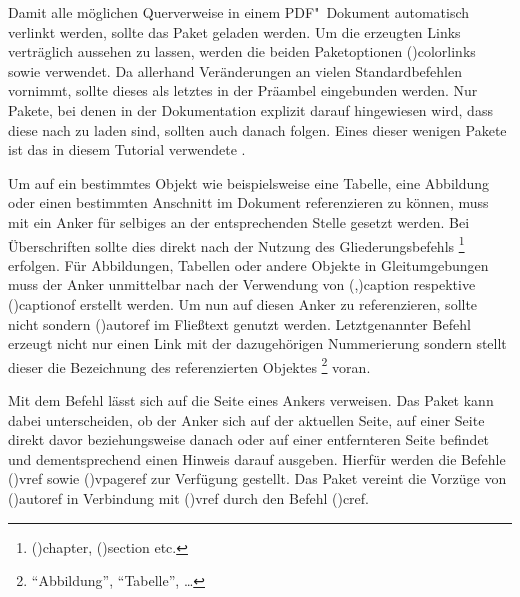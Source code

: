 \documentclass[%
  english,ngerman,%
  cdgeometry=no,DIV=12,%
  cd=false,cdfont=false,cdtitle=true,%
  headings=normal,%
  automark,%
  listof=toc,%
]{tudscrartcl}
\begin{document}
Damit alle möglichen Querverweise in einem PDF"~Dokument automatisch verlinkt 
werden, sollte das Paket  geladen werden. Um die erzeugten 
Links verträglich aussehen zu lassen, werden die beiden Paketoptionen 
\Option(){colorlinks} sowie  
verwendet. Da  allerhand Veränderungen an vielen 
Standardbefehlen vornimmt, sollte dieses als letztes in der Präambel 
eingebunden werden. Nur Pakete, bei denen in der Dokumentation explizit darauf 
hingewiesen wird, dass diese nach  zu laden sind, sollten 
auch danach folgen. Eines dieser wenigen Pakete ist das in diesem Tutorial 
verwendete . 
%
\begin{Hint}
\usepackage[colorlinks,linkcolor=blue]{hyperref}

\end{Hint}
%
Um auf ein bestimmtes Objekt wie beispielsweise eine Tabelle, eine Abbildung 
oder einen bestimmten Anschnitt im Dokument referenzieren zu können, muss mit 
 ein Anker für selbiges an der entsprechenden 
Stelle gesetzt werden. Bei Überschriften sollte dies direkt nach der Nutzung 
des Gliederungsbefehls%
\footnote{%
  \Macro(){chapter}, 
  \Macro(){section} etc.%
}
erfolgen. Für Abbildungen, Tabellen oder andere Objekte in Gleitumgebungen muss 
der Anker unmittelbar nach der Verwendung von 
\Macro(,){caption} respektive 
\Macro(){captionof} erstellt werden. Um nun auf diesen 
Anker zu referenzieren, sollte nicht  sondern 
\Macro(){autoref} im Fließtext genutzt werden. Letztgenannter 
Befehl erzeugt nicht nur einen Link mit der dazugehörigen Nummerierung sondern 
stellt dieser die Bezeichnung des referenzierten Objektes%
\footnote{\enquote{Abbildung}, \enquote{Tabelle}, \dots}
voran. 

Mit dem Befehl  lässt sich auf die Seite eines Ankers verweisen. 
Das Paket  kann dabei unterscheiden, ob der Anker sich auf 
der aktuellen Seite, auf einer Seite direkt davor beziehungsweise danach oder 
auf einer entfernteren Seite befindet und dementsprechend einen Hinweis darauf 
ausgeben. Hierfür werden die Befehle \Macro(){vref} sowie 
\Macro(){vpageref} zur Verfügung gestellt. Das Paket 
 vereint die Vorzüge von \Macro(){autoref} 
in Verbindung mit \Macro(){vref} durch den Befehl 
\Macro(){cref}.
\end{document}
